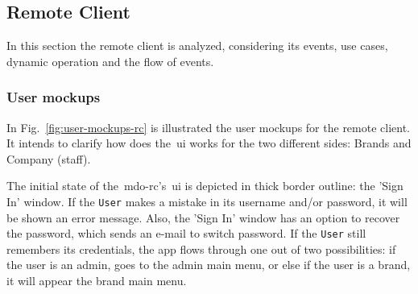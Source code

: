 %
\subsection{Remote Client}
\label{sec:remote-cli-decomp}
%
In this section the remote client is analyzed, considering its events, use cases, dynamic operation and the flow of events.

\subsubsection{User mockups}
\label{sec:user-mockups-1}
%
In Fig.~\ref{fig:user-mockups-rc} is illustrated the user mockups for the remote client. 
It intends to clarify how does the~\gls{ui} works for the two different sides: Brands and Company (staff).

The initial state of the~\gls{mdo-rc}'s~\gls{ui} is depicted in thick border outline: the 'Sign In' window. 
If the \texttt{User} makes a mistake in its username and/or password, it will be shown an error message. 
Also, the 'Sign In' window has an option to recover the password, which sends an e-mail to switch password.
If the \texttt{User} still remembers its credentials, the app flows through one out of two possibilities: if the user is an admin, goes to the admin main menu, or else if the user is a brand, it will appear the brand main menu.


